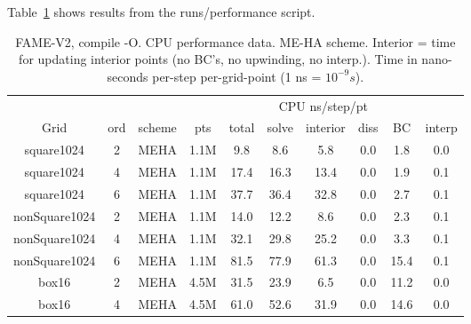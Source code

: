 \mni 
Table~\ref{tab:cpuPerformance} shows results from the runs/performance script.
{
\begin{table}[hbt] \small
\centering
\begin{tabular}{|c|c|c|c|c|c|c|c|c|c|} \hline
            &        &       & \multicolumn{7}{c|}{CPU ns/step/pt}  \\ 
   Grid         & ord & scheme & pts   & total   &  solve  &  interior  & diss  &   BC  & interp \\  \hline
  square1024 & 2 & MEHA  & 1.1M  &     9.8 &     8.6 &     5.8 &     0.0 &     1.8 &     0.0   \\
  square1024 & 4 & MEHA  & 1.1M  &    17.4 &    16.3 &    13.4 &     0.0 &     1.9 &     0.1   \\
  square1024 & 6 & MEHA  & 1.1M  &    37.7 &    36.4 &    32.8 &     0.0 &     2.7 &     0.1   \\
\hline
  nonSquare1024 & 2 & MEHA  & 1.1M  &    14.0 &    12.2 &     8.6 &     0.0 &     2.3 &     0.1   \\
  nonSquare1024 & 4 & MEHA  & 1.1M  &    32.1 &    29.8 &    25.2 &     0.0 &     3.3 &     0.1   \\
  nonSquare1024 & 6 & MEHA  & 1.1M  &    81.5 &    77.9 &    61.3 &     0.0 &    15.4 &     0.1   \\
\hline   
  box16 & 2 & MEHA  & 4.5M  &    31.5 &    23.9 &     6.5 &     0.0 &    11.2 &     0.0   \\
  box16 & 4 & MEHA  & 4.5M  &    61.0 &    52.6 &    31.9 &     0.0 &    14.6 &     0.0   \\
\hline  
\end{tabular}
\caption{FAME-V2, compile -O. CPU performance data. ME-HA scheme. Interior = time for updating interior points (no BC's, no upwinding, no interp.).
Time in nano-seconds per-step per-grid-point (1 ns = $10^{-9}s$).
}
\label{tab:cpuPerformance}    
\end{table}
}

